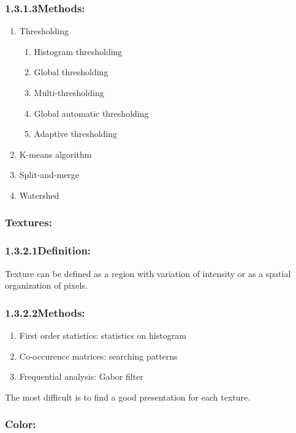 \subsubsection*{1.3.1.3\hspace{0.5cm}Methods:}
\begin{enumerate}
\item Thresholding
\begin{enumerate}
\item Histogram thresholding
\item Global thresholding
\item Multi-thresholding
\item Global automatic thresholding
\item Adaptive thresholding
\end{enumerate}
\item K-means algorithm
\item Split-and-merge
\item Watershed
\end{enumerate}
\subsubsection{Textures:}
\subsubsection*{1.3.2.1\hspace{0.5cm}Definition:}
Texture can be defined as a region with variation of intensity or as a spatial organization of pixels.
\subsubsection*{1.3.2.2\hspace{0.5cm}Methods:}
\begin{enumerate}
\item First order statistics: statistics on histogram
\item Co-occurence matrices: searching patterns
\item Frequential analysis: Gabor filter
\end{enumerate}
The most difficult is to find a good presentation for each texture.
\subsubsection{Color:}
